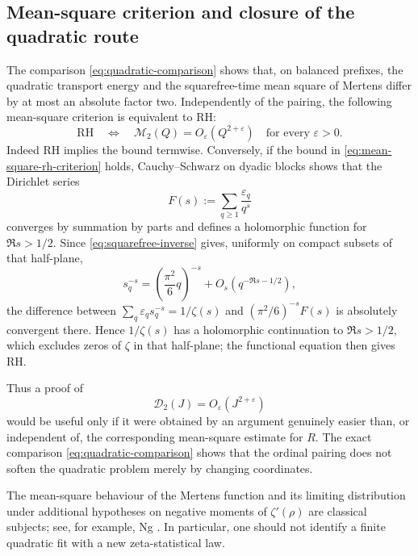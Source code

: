 \documentclass[11pt]{amsart}
\numberwithin{equation}{section}
\theoremstyle{plain}
\theoremstyle{definition}
\theoremstyle{remark}
\begin{document}
\subsection{Mean-square criterion and closure of the quadratic route}
\label{subsec:quadratic-closure}

The comparison \eqref{eq:quadratic-comparison} shows that, on balanced
prefixes, the quadratic transport energy and the squarefree-time mean square of
Mertens differ by at most an absolute factor two.  Independently of the
pairing, the following mean-square criterion is equivalent to RH:
\begin{equation}
\label{eq:mean-square-rh-criterion}
\mathrm{RH}
\quad\Longleftrightarrow\quad
\mathcal M_2(Q)=O_\varepsilon\!\left(Q^{2+\varepsilon}\right)
\quad\text{for every }\varepsilon>0.
\end{equation}
Indeed RH implies the bound termwise.  Conversely, if the bound in
\eqref{eq:mean-square-rh-criterion} holds, Cauchy--Schwarz on dyadic blocks
shows that the Dirichlet series
\begin{equation}
\label{eq:squarefree-sign-dirichlet}
F(s):=\sum_{q\ge1}\frac{\varepsilon_q}{q^s}
\end{equation}
converges by summation by parts and defines a holomorphic function for
$\Re s>1/2$.  Since \eqref{eq:squarefree-inverse} gives, uniformly on compact
subsets of that half-plane,
\begin{equation}
\label{eq:squarefree-weight-comparison}
s_q^{-s}=\left(\frac{\pi^2}{6}q\right)^{-s}
+O_s\!\left(q^{-\Re s-1/2}\right),
\end{equation}
the difference between
$\sum_q\varepsilon_q s_q^{-s}=1/\zeta(s)$ and
$(\pi^2/6)^{-s}F(s)$ is absolutely convergent there.  Hence $1/\zeta(s)$ has a
holomorphic continuation to $\Re s>1/2$, which excludes zeros of $\zeta$ in
that half-plane; the functional equation then gives RH.

Thus a proof of
\begin{equation}
\label{eq:D2-target}
\mathcal D_2(J)=O_\varepsilon\!\left(J^{2+\varepsilon}\right)
\end{equation}
would be useful only if it were obtained by an argument genuinely easier than,
or independent of, the corresponding mean-square estimate for $R$.  The exact
comparison \eqref{eq:quadratic-comparison} shows that the ordinal pairing does
not soften the quadratic problem merely by changing coordinates.

The mean-square behaviour of the Mertens function and its limiting
distribution under additional hypotheses on negative moments of
$\zeta'(\rho)$ are classical subjects; see, for example, Ng
\cite{Ng2004}.  In particular, one should not identify a finite quadratic fit
with a new zeta-statistical law.
\end{document}
